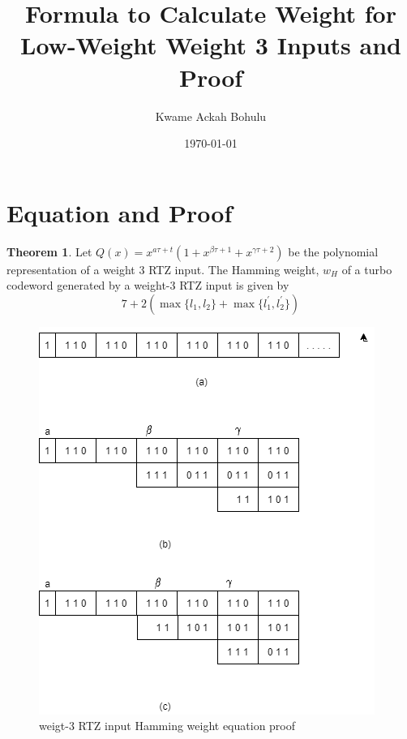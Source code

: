 \documentclass[fontsize=12pt]{article}
\title{Formula to Calculate Weight for Low-Weight Weight 3 Inputs and Proof}
\author{Kwame Ackah Bohulu}
\date{\today}
\theoremstyle{definition}
\newtheorem{theorem}{Theorem}[section]
\begin{document}
\maketitle

\newpage


\section{Equation and Proof}


\begin{theorem}
Let $Q(x) =x^{a\tau+t}(1+x^{\beta \tau +1}+x^{\gamma \tau +2})$ be the polynomial representation of a weight $3$ RTZ input.
The Hamming weight, $w_H$ of a turbo codeword generated by a weight-$3$ RTZ input is given by 
\begin{equation}
7+2(\max\{l_1,l_2\}+\max\{l^{\prime}_1,l^{\prime}_2\})
\end{equation}
\end{theorem}

\begin{figure}[h]
  \includegraphics[scale=1,bb=0 0 30 30]{wt3_proof}
\caption{weigt-$3$ RTZ input Hamming weight equation proof}
\end{figure}
\end{document}
